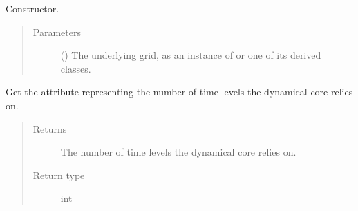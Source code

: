 \documentclass[letterpaper,10pt,english]{sphinxmanual}
\begin{document}
\begin{fulllineitems}
\begin{fulllineitems}
\begin{quote}
\begin{description}
\begin{itemize}
\end{itemize}


\end{description}\end{quote}

\end{fulllineitems}


\begin{fulllineitems}
\label{\detokenize{api:tasmania.parameterizations.adjustments.Adjustment.__init__}}
Constructor.
\begin{quote}\begin{description}
\item[{Parameters}] \leavevmode
{} () \textendash{} The underlying grid, as an instance of {\hyperref[\detokenize{api:tasmania.grids.grid_xyz.GridXYZ}]{}} or one of its derived classes.

\end{description}\end{quote}

\end{fulllineitems}


\begin{fulllineitems}
\label{\detokenize{api:tasmania.parameterizations.adjustments.Adjustment.time_levels}}
Get the attribute representing the number of time levels the dynamical core relies on.
\begin{quote}\begin{description}
\item[{Returns}] \leavevmode
The number of time levels the dynamical core relies on.

\item[{Return type}] \leavevmode
int

\end{description}\end{quote}

\end{fulllineitems}


\end{fulllineitems}
\end{document}
